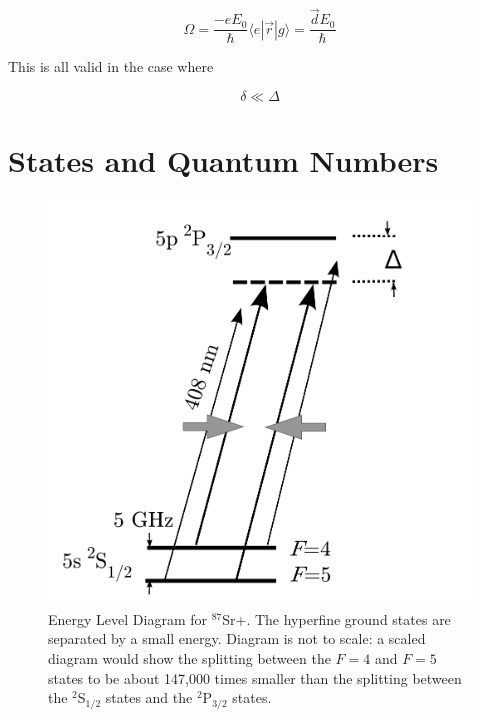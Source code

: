 \begin{equation}
\Omega = \frac{-eE_0}{\hbar}\langle e |\vec{r}|g\rangle=\frac{\vec{d}E_0}{\hbar}
\end{equation}

This is all valid in the case where 

\begin{equation}
\delta\ll\Delta
\end{equation}



\section{States and Quantum Numbers}

\begin{figure}
\centerline{
\includegraphics[totalheight=0.3\textheight]{E_level_from_proposal}
}
\caption[Energy Level Diagram for $^{87}$Sr+]{Energy Level Diagram for $^{87}$Sr+. The hyperfine ground states are separated by a small energy. Diagram is not to scale: a scaled diagram would show the splitting between the $F=4$ and $F=5$ states to be about 147,000 times smaller than the splitting between the $^2$S$_{1/2}$ states and the $^2$P$_{3/2}$ states.}
\end{figure}

